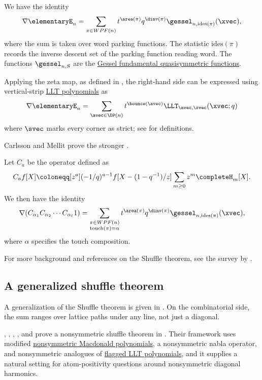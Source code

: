 \begin{theorem}
We have the identity
\[
\nabla \elementaryE_n =
\sum_{\pi \in WPF(n)}
  t^{\area(\pi)}q^{\dinv(\pi)}
  \gessel_{n,\mathrm{ides}(\pi)}(\xvec),
\]
where the sum is taken over word parking functions.  The statistic
\(\mathrm{ides}(\pi)\) records the inverse descent set of the parking
function reading word.  The functions \(\gessel_{n,S}\) are the
\hyperref[gessel]{Gessel fundamental quasisymmetric functions}.
\end{theorem}

Applying the zeta map, as defined in \cite[p.~82]{qtCatalanBook},
the right-hand side can be expressed using
vertical-strip \hyperref[unicellularLLT]{LLT polynomials} as
\[
\nabla \elementaryE_n = \sum_{\avec \in \DP(n)} t^{\bounce(\avec)} \LLT_{\avec,\svec}(\xvec;q)
\]
where $\svec$ marks every corner as strict; see
\cite{AlexanderssonPanova2018} for definitions.


Carlsson and Mellit prove the stronger
\label{compositionalShuffleTheorem}.
\begin{theorem}
Let $C_a$ be the operator defined as
\[
C_a f[X] \coloneqq
[z^a] (-1/q)^{a-1} f[X-(1-q^{-1})/z]
\sum_{m\geq 0} z^m \completeH_m[X].
\]
We then have the identity
\[
\nabla (C_{\alpha_1} C_{\alpha_2}\dotsm C_{\alpha_\ell} 1)
=
\sum_{\substack{\pi \in WPF(n) \\ \mathrm{touch}(\pi)=\alpha }}
  t^{\area(\pi)}q^{\dinv(\pi)}
  \gessel_{n,\mathrm{ides}(\pi)}(\xvec),
\]
where \(\alpha\) specifies the touch composition.
\end{theorem}

For more background and references on the Shuffle theorem, see the survey by
 \cite{vanWilligenburg2019}.

\subsection[dhShuffleTheoremGen]{A generalized shuffle theorem}

A generalization of the Shuffle theorem is given in
\cite{BlasiakHaimanMorsePunSeelinger2021x}.  On the combinatorial side, the
sum ranges over lattice paths under any line, not just a diagonal.

, , ,
, and  prove a nonsymmetric
shuffle theorem in \cite{BlasiakHaimanMorsePunSeelinger2025Shuffle}.
Their framework uses modified \hyperref[nonSymmetricMacdonaldPolynomial]{nonsymmetric
Macdonald polynomials}, a nonsymmetric nabla operator, and nonsymmetric
analogues of \hyperref[flaggedLLT]{flagged LLT polynomials}, and it supplies a natural setting for atom-positivity
questions around nonsymmetric diagonal harmonics.



